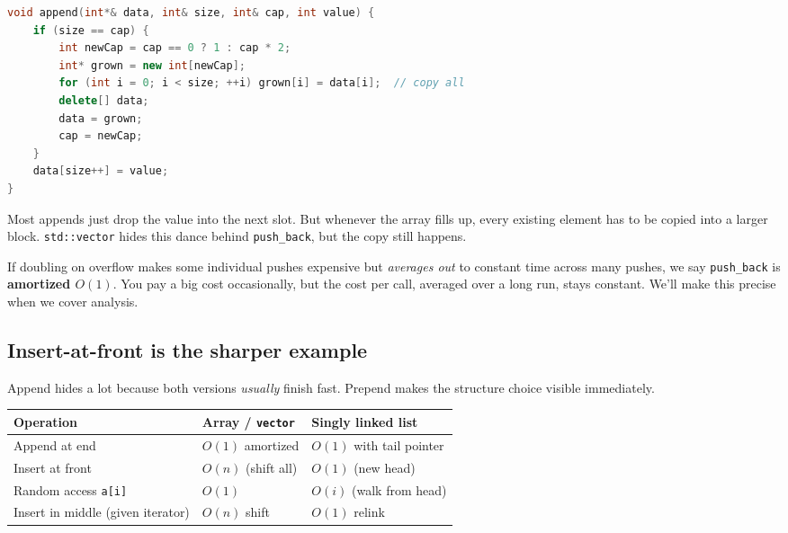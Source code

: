\documentclass[11pt]{article}
\begin{document}
\begin{examplebox}
\begin{lstlisting}[basicstyle=\ttfamily\small,frame=single,language=C++]
void append(int*& data, int& size, int& cap, int value) {
    if (size == cap) {
        int newCap = cap == 0 ? 1 : cap * 2;
        int* grown = new int[newCap];
        for (int i = 0; i < size; ++i) grown[i] = data[i];  // copy all
        delete[] data;
        data = grown;
        cap = newCap;
    }
    data[size++] = value;
}
\end{lstlisting}
Most appends just drop the value into the next slot. But whenever the
array fills up, every existing element has to be copied into a larger
block. \texttt{std::vector} hides this dance behind \texttt{push\_back},
but the copy still happens.
\end{examplebox}

\begin{notebox}
If doubling on overflow makes some individual pushes expensive but
\emph{averages out} to constant time across many pushes, we say
\texttt{push\_back} is \textbf{amortized \(O(1)\)}. You pay a big
cost occasionally, but the cost per call, averaged over a long run,
stays constant. We'll make this precise when we cover analysis.
\end{notebox}

\subsection*{Insert-at-front is the sharper example}

Append hides a lot because both versions \emph{usually} finish fast.
Prepend makes the structure choice visible immediately.

\begin{center}
\footnotesize
\renewcommand{\arraystretch}{1.25}
\begin{tabular}{@{}lll@{}}
\hline
Operation & Array / \texttt{vector} & Singly linked list \\
\hline
Append at end        & $O(1)$ amortized    & $O(1)$ with tail pointer \\
Insert at front      & $O(n)$ (shift all)  & $O(1)$ (new head) \\
Random access \texttt{a[i]} & $O(1)$         & $O(i)$ (walk from head) \\
Insert in middle (given iterator) & $O(n)$ shift & $O(1)$ relink \\
\hline
\end{tabular}
\end{center}
\end{document}
